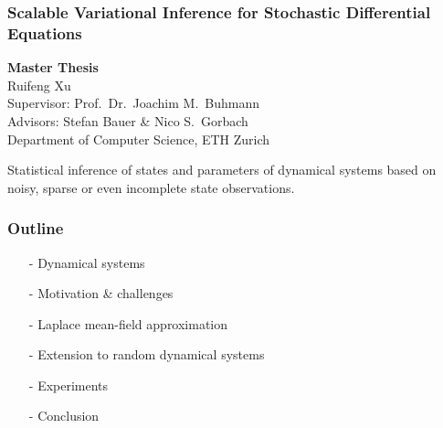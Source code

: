 \begin{titlestyleframe}
    \frametitle{Scalable Variational Inference for Stochastic Differential Equations}
    {\tiny 
        \textbf{Master Thesis}\\
        Ruifeng Xu\\
        Supervisor: Prof.\ Dr.\ Joachim M.\ Buhmann\\
        Advisors: Stefan Bauer \& Nico S.\ Gorbach\\
        Department of Computer Science, ETH Zurich\\
    }
\end{titlestyleframe}

\begin{frame}
    Statistical inference of states and parameters of dynamical systems based on noisy, sparse or even incomplete state observations.
\end{frame}

\begin{frame}[t]
    \frametitle{Outline}
    \begin{itemize}       
        \item[-] Dynamical systems
        \item[-] Motivation \& challenges    
        \item[-] Laplace mean-field approximation
        \item[-] Extension to random dynamical systems
        \item[-] Experiments
        \item[-] Conclusion
    \end{itemize}
\end{frame}
